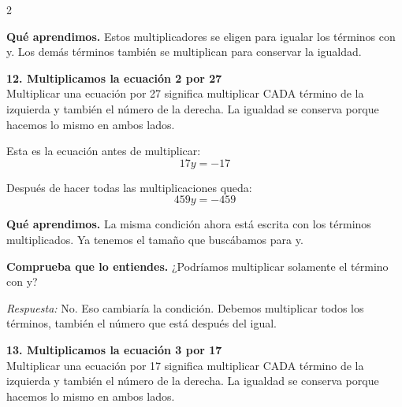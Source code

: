 \documentclass[11pt,a4paper,landscape]{article}
\begin{document}
\begin{multicols*}{2}
\begin{minipage}{\linewidth}
\par\smallskip\textbf{Qué aprendimos.} Estos multiplicadores se eligen para igualar los términos con y. Los demás términos también se multiplican para conservar la igualdad.
\end{minipage}\par\medskip
\noindent\begin{minipage}{\linewidth}\textbf{12. Multiplicamos la ecuación 2 por 27}\\[2pt]Multiplicar una ecuación por 27 significa multiplicar CADA término de la izquierda y también el número de la derecha. La igualdad se conserva porque hacemos lo mismo en ambos lados.
\par\smallskip Esta es la ecuación antes de multiplicar:
\[17y = -17\]
\par{}\par\smallskip
\par\smallskip Después de hacer todas las multiplicaciones queda:
\[459y = -459\]
\par\smallskip\textbf{Qué aprendimos.} La misma condición ahora está escrita con los términos multiplicados. Ya tenemos el tamaño que buscábamos para y.
\par\smallskip\textbf{Comprueba que lo entiendes.} ¿Podríamos multiplicar solamente el término con y?\par\textit{Respuesta:} No. Eso cambiaría la condición. Debemos multiplicar todos los términos, también el número que está después del igual.
\end{minipage}\par\medskip
\noindent\begin{minipage}{\linewidth}\textbf{13. Multiplicamos la ecuación 3 por 17}\\[2pt]Multiplicar una ecuación por 17 significa multiplicar CADA término de la izquierda y también el número de la derecha. La igualdad se conserva porque hacemos lo mismo en ambos lados.

\end{minipage}
\end{multicols*}
\end{document}
